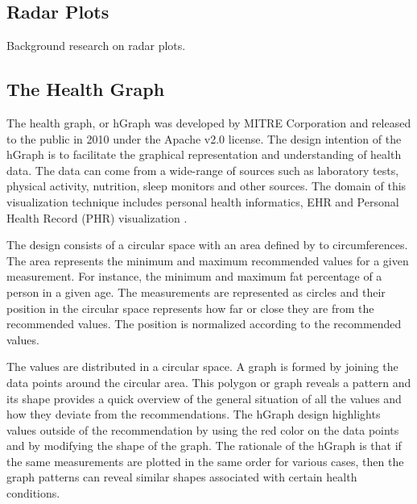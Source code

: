 \documentclass[twocolumn]{bmcart}%
\begin{document}
\subsection*{Radar Plots}

Background research on radar plots.

\subsection*{The Health Graph}

The health graph, or hGraph was developed by MITRE Corporation and released to the public in 2010 under the Apache v2.0 license. The design intention of the hGraph is to facilitate the graphical representation and understanding of health data. The data can come from a wide-range of sources such as laboratory tests, physical activity, nutrition, sleep monitors and other sources. The domain of this visualization technique includes personal health informatics, EHR and Personal Health Record (PHR) visualization \cite{follett2012hgraph}.

The design consists of a circular space with an area defined by to circumferences. The area represents the minimum and maximum recommended values for a given measurement. For instance, the minimum and maximum fat percentage of a person in a given age. The measurements are represented as circles and their position in the circular space represents how far or close they are from the recommended values. The position is normalized according to the recommended values.

The values are distributed in a circular space. A graph is formed by joining the data points around the circular area. This polygon or graph reveals a pattern and its shape provides a quick overview of the general situation of all the values and how they deviate from the recommendations. The hGraph design highlights values outside of the recommendation by using the red color on the data points and by modifying the shape of the graph. The rationale of the hGraph is that if the same measurements are plotted in the same order for various cases, then the graph patterns can reveal similar shapes associated with certain health conditions.


\end{document}
